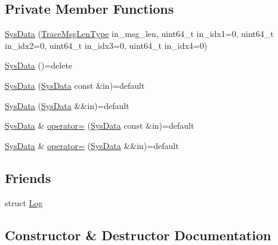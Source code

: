 \subsection*{Private Member Functions}
\begin{DoxyCompactItemize}
\item 
\hyperlink{structvt_1_1trace_1_1_log_1_1_data_1_1_sys_data_a409b1a46a6e1212384eeb2c7896ebd82}{Sys\+Data} (\hyperlink{namespacevt_1_1trace_aeb598f45d67d41db7902e494f2f0ce59}{Trace\+Msg\+Len\+Type} in\+\_\+msg\+\_\+len, uint64\+\_\+t in\+\_\+idx1=0, uint64\+\_\+t in\+\_\+idx2=0, uint64\+\_\+t in\+\_\+idx3=0, uint64\+\_\+t in\+\_\+idx4=0)
\item 
\hyperlink{structvt_1_1trace_1_1_log_1_1_data_1_1_sys_data_a35e7fc0961e160b73374b53b9656222d}{Sys\+Data} ()=delete
\item 
\hyperlink{structvt_1_1trace_1_1_log_1_1_data_1_1_sys_data_a6d5dc7ba096a74ed66386176df36bf4b}{Sys\+Data} (\hyperlink{structvt_1_1trace_1_1_log_1_1_data_1_1_sys_data}{Sys\+Data} const \&in)=default
\item 
\hyperlink{structvt_1_1trace_1_1_log_1_1_data_1_1_sys_data_ab8002e7c2ddfd7fa6ddcaa8ccfb2d2f1}{Sys\+Data} (\hyperlink{structvt_1_1trace_1_1_log_1_1_data_1_1_sys_data}{Sys\+Data} \&\&in)=default
\item 
\hyperlink{structvt_1_1trace_1_1_log_1_1_data_1_1_sys_data}{Sys\+Data} \& \hyperlink{structvt_1_1trace_1_1_log_1_1_data_1_1_sys_data_a94623b2567c68de75733f1d723dc442e}{operator=} (\hyperlink{structvt_1_1trace_1_1_log_1_1_data_1_1_sys_data}{Sys\+Data} const \&in)=default
\item 
\hyperlink{structvt_1_1trace_1_1_log_1_1_data_1_1_sys_data}{Sys\+Data} \& \hyperlink{structvt_1_1trace_1_1_log_1_1_data_1_1_sys_data_aea522b1b444fc88e3ac9449290ef1527}{operator=} (\hyperlink{structvt_1_1trace_1_1_log_1_1_data_1_1_sys_data}{Sys\+Data} \&\&in)=default
\end{DoxyCompactItemize}
\subsection*{Friends}
\begin{DoxyCompactItemize}
\item 
struct \hyperlink{structvt_1_1trace_1_1_log_1_1_data_1_1_sys_data_add132ae9df1b7ef820c8082c32b0f839}{Log}
\end{DoxyCompactItemize}


\subsection{Constructor \& Destructor Documentation}
\mbox{\label{structvt_1_1trace_1_1_log_1_1_data_1_1_sys_data_a409b1a46a6e1212384eeb2c7896ebd82}} 
